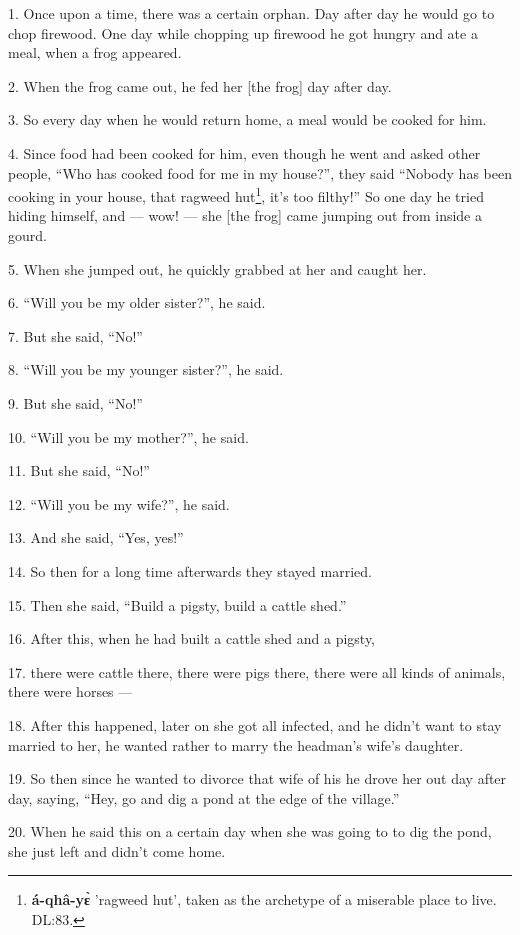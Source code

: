 \setcounter{footnote}{0}

1. Once upon a time, there was a certain orphan. Day after day he would go to chop
firewood. One day while chopping up firewood he got hungry and ate a meal, when
a frog appeared.

2. When the frog came out, he fed her [the frog] day after day.

3. So every day when he would return home, a meal would be cooked for him.

4. Since food had been cooked for him, even though he went and asked other people,
``Who has cooked food for me in my house?'', they said ``Nobody has been cooking
in your house, that ragweed hut\footnote{\textbf{á-qhâ-yɛ̀} 'ragweed hut', taken as the archetype of a miserable place to live. DL:83.}, it's too filthy!'' So one day he tried hiding
himself, and --- wow! --- she [the frog] came jumping out from inside a gourd.

5. When she jumped out, he quickly grabbed at her and caught her.

6. ``Will you be my older sister?'', he said.

7. But she said, ``No!''

8. ``Will you be my younger sister?'', he said.

9. But she said, ``No!''

10. ``Will you be my mother?'', he said.

11. But she said, ``No!''

12. ``Will you be my wife?'', he said.

13. And she said, ``Yes, yes!''

14. So then for a long time afterwards they stayed married.

15. Then she said, ``Build a pigsty, build a cattle shed.''

16. After this, when he had built a cattle shed and a pigsty,

17. there were cattle there, there were pigs there, there were all kinds of animals,
there were horses ---

18. After this happened, later on she got all infected, and he didn't want to stay
married to her, he wanted rather to marry the headman's wife's daughter.

19. So then since he wanted to divorce that wife of his he drove her out day after
day, saying, ``Hey, go and dig a pond at the edge of the village.''

20. When he said this on a certain day when she was going to to dig the pond, she
just left and didn't come home.

